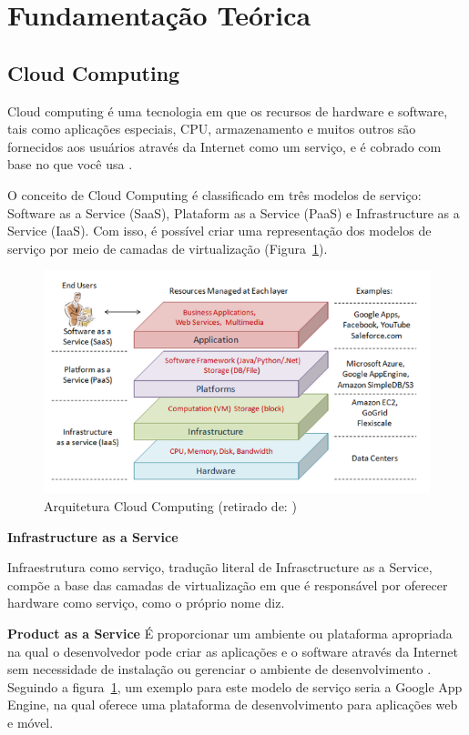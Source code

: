 \documentclass[12pt]{article}
\begin{document}
\section{Fundamentação Teórica} \label{sec:firstpage}

\subsection{Cloud Computing}

Cloud computing é uma tecnologia em que os recursos de hardware e software, tais como aplicações especiais, CPU, armazenamento e muitos outros são fornecidos aos usuários através da Internet como um serviço, e é cobrado com base no que você usa \cite{1}.

O conceito de Cloud Computing é classificado em três modelos de serviço: Software as a Service (SaaS), Plataform as a Service (PaaS) e Infrastructure as a Service (IaaS). Com isso, é possível criar uma representação dos modelos de serviço por meio de camadas de virtualização (Figura~\ref{fig:architeture}).

\begin{figure}[ht]
\centering
\includegraphics[width=.9\textwidth]{architeture.png}
\caption{Arquitetura Cloud Computing (retirado de: \cite{2})}
\label{fig:architeture}
\end{figure}

\textbf{Infrastructure as a Service}

Infraestrutura como serviço, tradução literal de Infrasctructure as a Service, compõe a base das camadas de virtualização em que é responsável por oferecer hardware como serviço, como o próprio nome diz.

\textbf{Product as a Service}
É proporcionar um ambiente ou plataforma apropriada na qual o
desenvolvedor pode criar as aplicações e o software através da Internet sem necessidade de instalação ou gerenciar o ambiente de desenvolvimento \cite{1}. Seguindo a figura~\ref{fig:architeture}, um exemplo para este modelo de serviço seria a Google App Engine, na qual oferece uma plataforma de desenvolvimento para aplicações web e móvel.
\end{document}
